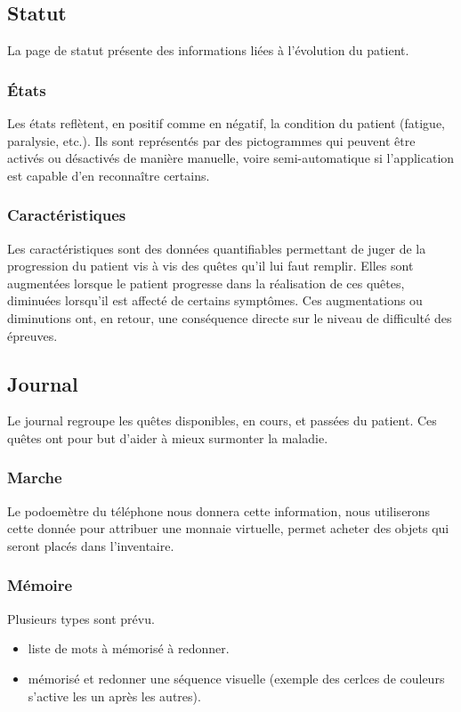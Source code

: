 \documentclass[a4paper,12pt,francais]{article}
\begin{document}
\subsection{Statut}
La page de statut présente des informations liées à l'évolution du patient.
\subsubsection{États}
Les états reflètent, en positif comme en négatif, la condition du patient (fatigue, paralysie, etc.). Ils sont représentés par des pictogrammes qui peuvent être activés ou désactivés de manière manuelle, voire semi-automatique si l'application est capable d'en reconnaître certains.
\subsubsection{Caractéristiques}
Les caractéristiques sont des données quantifiables permettant de juger de la progression du patient vis à vis des quêtes qu'il lui faut remplir. Elles sont augmentées lorsque le patient progresse dans la réalisation de ces quêtes, diminuées lorsqu'il est affecté de certains symptômes. Ces augmentations ou diminutions ont, en retour, une conséquence directe sur le niveau de difficulté des épreuves.
\subsection{Journal}
Le journal regroupe les quêtes disponibles, en cours, et passées du patient. Ces quêtes ont pour but d'aider à mieux surmonter la maladie.
\subsubsection{Marche}
Le podoemètre du téléphone nous donnera cette information, nous utiliserons cette donnée pour attribuer une monnaie virtuelle, permet acheter des objets qui seront placés dans l'inventaire.
\subsubsection{Mémoire}
Plusieurs types sont prévu. 
\begin{itemize}
    \item liste de mots à mémorisé à redonner.
    \item mémorisé et redonner une séquence visuelle (exemple des cerlces de couleurs s'active les un après les autres).
\end{itemize}
\end{document}
